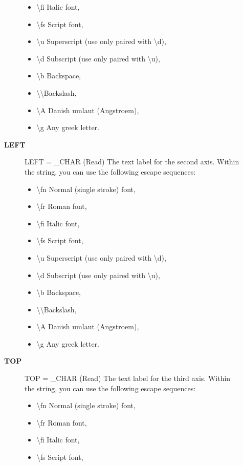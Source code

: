 \begin{description}
\begin{description}
\begin{itemize}
   \item \textbackslash fi Italic font,
   \item \textbackslash fs Script font,
   \item \textbackslash u  Superscript (use only paired with \textbackslash d),
   \item \textbackslash d  Subscript (use only paired with \textbackslash u),
   \item \textbackslash b  Backspace,
   \item \textbackslash \textbackslash   Backslash,
   \item \textbackslash A  Danish umlaut (Angstroem),
   \item \textbackslash g  Any greek letter.
   \end{itemize}
\item [\textbf{LEFT}]
LEFT = \_CHAR (Read)
   The text label for the second axis. Within the string, you can
   use the following escape sequences:
   \begin{itemize}
   \item \textbackslash fn Normal (single stroke) font,
   \item \textbackslash fr Roman font,
   \item \textbackslash fi Italic font,
   \item \textbackslash fs Script font,
   \item \textbackslash u  Superscript (use only paired with \textbackslash d),
   \item \textbackslash d  Subscript (use only paired with \textbackslash u),
   \item \textbackslash b  Backspace,
   \item \textbackslash \textbackslash   Backslash,
   \item \textbackslash A  Danish umlaut (Angstroem),
   \item \textbackslash g  Any greek letter.
   \end{itemize}
\item [\textbf{TOP}]
TOP = \_CHAR (Read)
   The text label for the third axis. Within the string, you can
   use the following escape sequences:
   \begin{itemize}
   \item \textbackslash fn Normal (single stroke) font,
   \item \textbackslash fr Roman font,
   \item \textbackslash fi Italic font,
   \item \textbackslash fs Script font,

\end{itemize}
\end{description}
\end{description}
